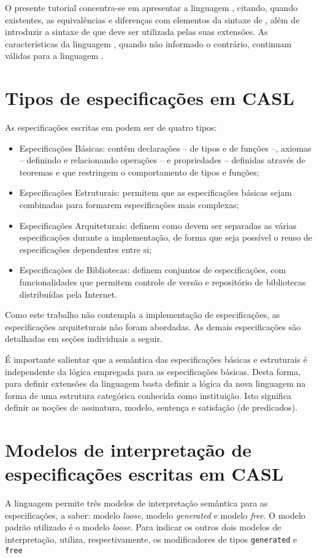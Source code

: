 O presente tutorial concentra-se em apresentar a linguagem \HasCASL, citando, quando existentes, as equivalências e diferenças com elementos da sintaxe de \CASL, além de introduzir a sintaxe de \CASL que deve ser utilizada pelas suas extensões.
As características da linguagem \CASL, quando não informado o contrário, continuam válidas para a linguagem \HasCASL.

\section{Tipos de especificações em CASL}

As especificações escritas em \CASL podem ser de quatro tipos:
\begin{itemize}
\item Especificações Básicas: contêm declarações -- de tipos e de funções --, axiomas -- definindo e relacionando operações -- e propriedades -- definidas através de teoremas e que restringem o comportamento de tipos e funções;
\item Especificações Estruturais: permitem que as especificações básicas sejam combinadas para formarem especificações mais complexas;
\item Especificações Arquiteturais: definem como devem ser separadas as várias especificações durante a implementação, de forma que seja possível o reuso de especificações dependentes entre si;
\item Especificações de Bibliotecas: definem conjuntos de especificações, com funcionalidades que permitem controle de versão e repositório de bibliotecas distribuídas pela Internet.
\end{itemize}

Como este trabalho não contempla a implementação de especificações, as especificações arquiteturais não foram abordadas.
As demais especificações são detalhadas em seções individuais a seguir.

É importante salientar que a semântica das especificações básicas e estruturais é independente da lógica empregada para as especificações básicas.
Desta forma, para definir extensões da linguagem \CASL basta definir a lógica da nova linguagem na forma de uma estrutura categórica conhecida como instituição.
Isto significa definir as noções de assinatura, modelo, sentença e satisfação (de predicados).

\section{Modelos de interpretação de especificações escritas em CASL}
A linguagem \CASL permite três modelos de interpretação semântica para as especificações, a saber: modelo \textit{loose}, modelo \textit{generated} e modelo \textit{free}.
O modelo padrão utilizado é o modelo \textit{loose}.
Para indicar os outros dois modelos de interpretação, \CASL utiliza, respectivamente, os modificadores de tipos \Verb.generated. e \Verb.free.

